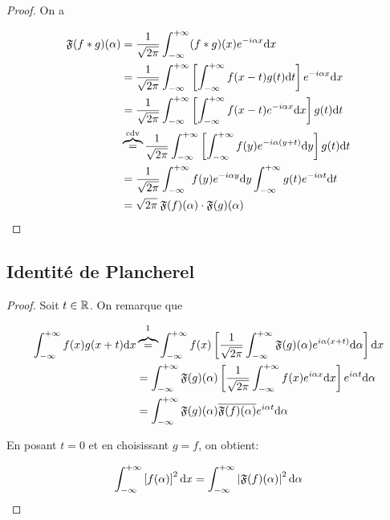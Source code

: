 \begin{proof}
    On a
    
    \begin{align*}
    \mathfrak{F}(f\ast g)(\alpha) &=
    \frac{1}{\sqrt{2 \pi}} \int_{-\infty}^{+\infty} (f\ast g)(x) e^{-i\alpha x} \mathrm{d}x
    \\&=
    \frac{1}{\sqrt{2 \pi}} \int_{-\infty}^{+\infty} \left[\int_{-\infty}^{+\infty} f(x-t)g(t)\mathrm{d}t\right] e^{-i\alpha x} \mathrm{d}x
    \\&=
    \frac{1}{\sqrt{2 \pi}} \int_{-\infty}^{+\infty} \left[\int_{-\infty}^{+\infty} f(x-t)e^{-i\alpha x}\mathrm{d}x\right] g(t) \mathrm{d}t
    \\&\overbrace{=}^{\textrm{cdv}}
    \frac{1}{\sqrt{2 \pi}} \int_{-\infty}^{+\infty} \left[\int_{-\infty}^{+\infty} f(y)e^{-i\alpha (y+t)}\mathrm{d}y\right] g(t) \mathrm{d}t
    \\&=
    \frac{1}{\sqrt{2 \pi}} \int_{-\infty}^{+\infty} f(y)e^{-i\alpha y}\mathrm{d}y \int_{-\infty}^{+\infty} g(t)e^{-i\alpha t}\mathrm{d}t
    \\&=
    \sqrt{2 \pi} \> \mathfrak{F}(f)(\alpha) \cdot \mathfrak{F}(g)(\alpha)
    \end{align*}
    
\end{proof}


\subsection{Identité de Plancherel}

\begin{proof}
    Soit $t\in \mathbb{R}$.
    On remarque que
    
    \begin{align*}
    \int_{-\infty}^{+\infty} f(x) g(x+t) \dx &\overbrace{=}^{\footnotemark}
    \int_{-\infty}^{+\infty}
    f(x)
    \left[
    \frac{1}{\sqrt{2 \pi}} \int_{-\infty}^{+\infty} \TF(g)(\alpha) e^{i\alpha (x + t)} \dal
    \right]
    \dx
    \\&=
    \int_{-\infty}^{+\infty}
    \TF(g)(\alpha)
    \left[
    \frac{1}{\sqrt{2 \pi}} \int_{-\infty}^{+\infty}
    f(x) e^{i\alpha x} \dx
    \right]
    e^{i\alpha t}
    \dal
    \\&=
    \int_{-\infty}^{+\infty}
    \TF(g)(\alpha)
    \overline{\TF(f)(\alpha)}
    e^{i\alpha t}
    \dal
    \end{align*}
    
    En posant $t = 0$ et en choisissant $g = f$, on obtient:
    
    \[
    \int_{-\infty}^{+\infty} \left[f(\alpha)\right]^2 \mathrm{d}x =
    \int_{-\infty}^{+\infty} \left|\mathfrak{F}(f)(\alpha)\right|^2 \mathrm{d}\alpha
    \]
\end{proof}

